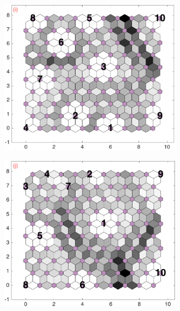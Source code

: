 \begin{figure}
\begin{subfigure}[b]{0.25\textwidth}
        \label{fig: col3and18_dist}
    \end{subfigure}
        \hfill
    \begin{subfigure}[b]{0.25\textwidth}
        \centering
        \includegraphics[width=\textwidth]{../../images0.01/M31/2D/diff_dimension/combine_2D_data_between_cols3and19.png}
        \label{fig: col3and19_dist}
    \end{subfigure}
        \hfill
    \begin{subfigure}[b]{0.25\textwidth}
        \centering
        \includegraphics[width=\textwidth]{../../images0.01/M31/2D/diff_dimension/combine_2D_data_between_cols3and20.png}

\end{subfigure}
\end{figure}
